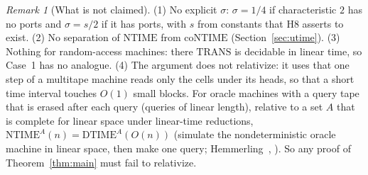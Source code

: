 \documentclass[11pt]{article}
\theoremstyle{definition}
\theoremstyle{remark}
\newtheorem{remark}[theorem]{Remark}
\newcommand{\DTIME}{\mathrm{DTIME}}
\newcommand{\NTIME}{\mathrm{NTIME}}
\newcommand{\coNTIME}{\mathrm{coNTIME}}
\newcommand{\TRANS}{\mathrm{TRANS}}
\begin{document}
\begin{remark}[What is not claimed]
(1) No explicit $\sigma$: $\sigma=1/4$ if characteristic $2$ has no ports and $\sigma=s/2$ if it has ports, with $s$ from constants
that H8 asserts to exist. (2) No separation of $\NTIME$ from
$\coNTIME$ (Section~\ref{sec:utime}). (3) Nothing for random-access machines: there $\TRANS$ is decidable in linear time, so Case~1
has no analogue. (4) The argument does not relativize: it uses that one step of a multitape machine reads only the cells under its
heads, so that a short time interval touches $O(1)$ small blocks. For oracle machines with a query tape that is erased after each
query (queries of linear length), relative to a set $A$ that is complete for linear space under linear-time reductions,
$\NTIME^{A}(n)=\DTIME^{A}(O(n))$ (simulate the nondeterministic oracle machine in linear space, then make one query; Hemmerling~\cite[Proposition 15]{Hem}, \cite[Corollary 1]{Hem13}). So any proof of Theorem~\ref{thm:main} must fail to relativize.
\end{remark}
\end{document}
